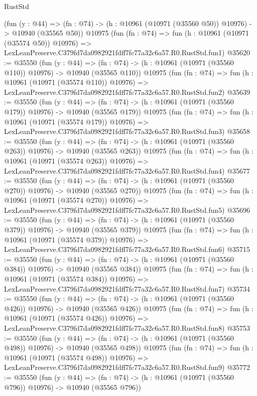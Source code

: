 \begin{lexlean}{RustStd}
\begin{coremodule}
    (fun (y : @44) =>
    (fn : @74) -> (h : @10961 (@10971 (@35560 @50)) @10976) -> @10940 (@35565 @50))
    @10975
    (fun (fn : @74) =>
    fun (h : @10961 (@10971 (@35574 @50)) @10976) =>
    LexLeanPreserve.C379fd7da0982921fdff7fc77a32c6a57.R0.RustStd.fun1)
@35620 := @35550
    (fun (y : @44) =>
    (fn : @74) -> (h : @10961 (@10971 (@35560 @110)) @10976) -> @10940 (@35565 @110))
    @10975
    (fun (fn : @74) =>
    fun (h : @10961 (@10971 (@35574 @110)) @10976) =>
    LexLeanPreserve.C379fd7da0982921fdff7fc77a32c6a57.R0.RustStd.fun2)
@35639 := @35550
    (fun (y : @44) =>
    (fn : @74) -> (h : @10961 (@10971 (@35560 @179)) @10976) -> @10940 (@35565 @179))
    @10975
    (fun (fn : @74) =>
    fun (h : @10961 (@10971 (@35574 @179)) @10976) =>
    LexLeanPreserve.C379fd7da0982921fdff7fc77a32c6a57.R0.RustStd.fun3)
@35658 := @35550
    (fun (y : @44) =>
    (fn : @74) -> (h : @10961 (@10971 (@35560 @263)) @10976) -> @10940 (@35565 @263))
    @10975
    (fun (fn : @74) =>
    fun (h : @10961 (@10971 (@35574 @263)) @10976) =>
    LexLeanPreserve.C379fd7da0982921fdff7fc77a32c6a57.R0.RustStd.fun4)
@35677 := @35550
    (fun (y : @44) =>
    (fn : @74) -> (h : @10961 (@10971 (@35560 @270)) @10976) -> @10940 (@35565 @270))
    @10975
    (fun (fn : @74) =>
    fun (h : @10961 (@10971 (@35574 @270)) @10976) =>
    LexLeanPreserve.C379fd7da0982921fdff7fc77a32c6a57.R0.RustStd.fun5)
@35696 := @35550
    (fun (y : @44) =>
    (fn : @74) -> (h : @10961 (@10971 (@35560 @379)) @10976) -> @10940 (@35565 @379))
    @10975
    (fun (fn : @74) =>
    fun (h : @10961 (@10971 (@35574 @379)) @10976) =>
    LexLeanPreserve.C379fd7da0982921fdff7fc77a32c6a57.R0.RustStd.fun6)
@35715 := @35550
    (fun (y : @44) =>
    (fn : @74) -> (h : @10961 (@10971 (@35560 @384)) @10976) -> @10940 (@35565 @384))
    @10975
    (fun (fn : @74) =>
    fun (h : @10961 (@10971 (@35574 @384)) @10976) =>
    LexLeanPreserve.C379fd7da0982921fdff7fc77a32c6a57.R0.RustStd.fun7)
@35734 := @35550
    (fun (y : @44) =>
    (fn : @74) -> (h : @10961 (@10971 (@35560 @426)) @10976) -> @10940 (@35565 @426))
    @10975
    (fun (fn : @74) =>
    fun (h : @10961 (@10971 (@35574 @426)) @10976) =>
    LexLeanPreserve.C379fd7da0982921fdff7fc77a32c6a57.R0.RustStd.fun8)
@35753 := @35550
    (fun (y : @44) =>
    (fn : @74) -> (h : @10961 (@10971 (@35560 @498)) @10976) -> @10940 (@35565 @498))
    @10975
    (fun (fn : @74) =>
    fun (h : @10961 (@10971 (@35574 @498)) @10976) =>
    LexLeanPreserve.C379fd7da0982921fdff7fc77a32c6a57.R0.RustStd.fun9)
@35772 := @35550
    (fun (y : @44) =>
    (fn : @74) -> (h : @10961 (@10971 (@35560 @796)) @10976) -> @10940 (@35565 @796))

\end{coremodule}
\end{lexlean}
